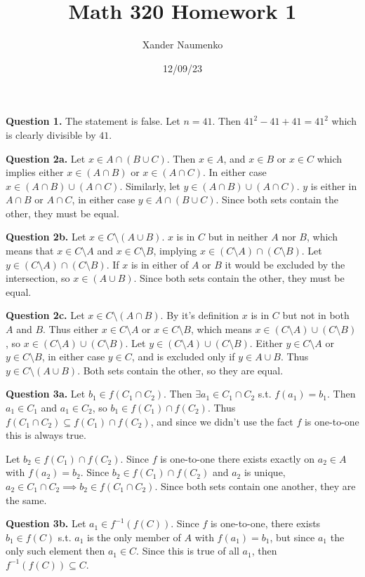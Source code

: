 \documentclass[letterpaper, reqno,11pt]{article}
\begin{document}
\title{Math 320 Homework 1}
\date{12/09/23}
\author{Xander Naumenko}
\maketitle

{\medskip\noindent\bf Question 1.} The statement is false. Let $n=41$. Then $41^2-41+41=41^2$ which is clearly divisible by $41$.

{\medskip\noindent\bf Question 2a.} Let $x\in A\cap(B\cup C)$. Then $x\in A$, and $x\in B$ or $x\in C$ which implies either $x\in (A\cap B)$ or $x\in (A\cap C)$. In either case $x\in (A\cap B)\cup(A\cap C)$. Similarly, let $y\in (A\cap B)\cup(A\cap C)$. $y$ is either in $A\cap B$ or $A\cap C$, in either case $y\in A\cap(B\cup C)$. Since both sets contain the other, they must be equal.

{\medskip\noindent\bf Question 2b.} Let $x\in C\setminus (A\cup B)$. $x$ is in $C$ but in neither $A$ nor $B$, which means that $x\in C\setminus A$ and $x\in C\setminus B$, implying $x\in (C\setminus A)\cap (C\setminus B)$. Let $y\in (C\setminus A)\cap (C\setminus B)$. If $x$ is in either of $A$ or $B$ it would be excluded by the intersection, so $x\in (A\cup B)$. Since both sets contain the other, they must be equal.

{\medskip\noindent\bf Question 2c.} Let $x\in C\setminus (A\cap B)$. By it's definition $x$ is in $C$ but not in both $A$ and $B$. Thus either $x\in C\setminus A$ or $x\in C\setminus B$, which means $x\in (C\setminus A)\cup (C\setminus B)$, so $x\in (C\setminus A)\cup (C\setminus B)$. Let $y\in (C\setminus A)\cup (C\setminus B)$. Either $y\in C\setminus A$ or $y\in C\setminus B$, in either case $y\in C$, and is excluded only if $y\in A\cup B$. Thus $y\in C\setminus (A\cup B)$. Both sets contain the other, so they are equal.

{\medskip\noindent\bf Question 3a.} Let $b_1\in f(C_1\cap C_2)$. Then $\exists a_1\in C_1\cap C_2$ s.t. $f(a_1)=b_1$. Then $a_1\in C_1$ and $a_1\in C_2$, so $b_1\in f(C_1)\cap f(C_2)$. Thus $f(C_1\cap C_2)\subseteq f(C_1)\cap f(C_2)$, and since we didn't use the fact $f$ is one-to-one this is always true.

Let $b_2\in f(C_1)\cap f(C_2)$. Since $f$ is one-to-one there exists exactly on $a_2\in A$ with $f(a_2)=b_2$. Since $b_2\in f(C_1)\cap f(C_2)$ and $a_2$ is unique, $a_2\in C_1\cap C_2\implies b_2\in f(C_1\cap C_2)$. Since both sets contain one another, they are the same.

{\medskip\noindent\bf Question 3b.} Let $a_1\in f^{-1}(f(C))$. Since $f$ is one-to-one, there exists $b_1\in f(C)$ s.t. $a_1$ is the only member of $A$ with $f(a_1)=b_1$, but since $a_1$ the only such element then $a_1\in C$. Since this is true of all $a_1$, then $f^{-1}(f(C))\subseteq C$.
\end{document}
